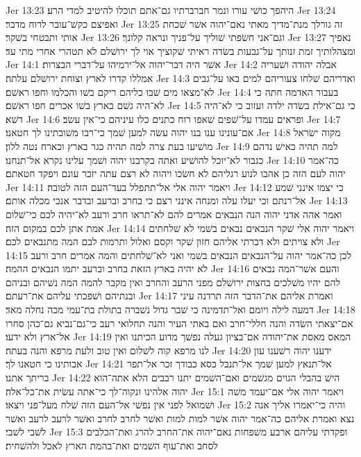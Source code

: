 Jer 13:23  היהפך כושׁי עורו ונמר חברברתיו גם־אתם תוכלו להיטיב למדי הרע׃
Jer 13:24  ואפיצם כקשׁ־עובר לרוח מדבר׃
Jer 13:25  זה גורלך מנת־מדיך מאתי נאם־יהוה אשׁר שׁכחת אותי ותבטחי בשׁקר׃
Jer 13:26  וגם־אני חשׂפתי שׁוליך על־פניך ונראה קלונך׃
Jer 13:27  נאפיך ומצהלותיך זמת זנותך על־גבעות בשׂדה ראיתי שׁקוציך אוי לך ירושׁלם לא תטהרי אחרי מתי עד׃
Jer 14:1  אשׁר היה דבר־יהוה אל־ירמיהו על־דברי הבצרות׃
Jer 14:2  אבלה יהודה ושׁעריה אמללו קדרו לארץ וצוחת ירושׁלם עלתה׃
Jer 14:3  ואדריהם שׁלחו צעוריהם למים באו על־גבים לא־מצאו מים שׁבו כליהם ריקם בשׁו והכלמו וחפו ראשׁם׃
Jer 14:4  בעבור האדמה חתה כי לא־היה גשׁם בארץ בשׁו אכרים חפו ראשׁם׃
Jer 14:5  כי גם־אילת בשׂדה ילדה ועזוב כי לא־היה דשׁא׃
Jer 14:6  ופראים עמדו על־שׁפים שׁאפו רוח כתנים כלו עיניהם כי־אין עשׂב׃
Jer 14:7  אם־עונינו ענו בנו יהוה עשׂה למען שׁמך כי־רבו משׁובתינו לך חטאנו׃
Jer 14:8  מקוה ישׂראל מושׁיעו בעת צרה למה תהיה כגר בארץ וכארח נטה ללון׃
Jer 14:9  למה תהיה כאישׁ נדהם כגבור לא־יוכל להושׁיע ואתה בקרבנו יהוה ושׁמך עלינו נקרא אל־תנחנו׃
Jer 14:10  כה־אמר יהוה לעם הזה כן אהבו לנוע רגליהם לא חשׂכו ויהוה לא רצם עתה יזכר עונם ויפקד חטאתם׃
Jer 14:11  ויאמר יהוה אלי אל־תתפלל בעד־העם הזה לטובה׃
Jer 14:12  כי יצמו אינני שׁמע אל־רנתם וכי יעלו עלה ומנחה אינני רצם כי בחרב וברעב ובדבר אנכי מכלה אותם׃
Jer 14:13  ואמר אהה אדני יהוה הנה הנבאים אמרים להם לא־תראו חרב ורעב לא־יהיה לכם כי־שׁלום אמת אתן לכם במקום הזה׃
Jer 14:14  ויאמר יהוה אלי שׁקר הנבאים נבאים בשׁמי לא שׁלחתים ולא צויתים ולא דברתי אליהם חזון שׁקר וקסם ואלול ותרמות לבם המה מתנבאים לכם׃
Jer 14:15  לכן כה־אמר יהוה על־הנבאים הנבאים בשׁמי ואני לא־שׁלחתים והמה אמרים חרב ורעב לא יהיה בארץ הזאת בחרב וברעב יתמו הנבאים ההמה׃
Jer 14:16  והעם אשׁר־המה נבאים להם יהיו משׁלכים בחצות ירושׁלם מפני הרעב והחרב ואין מקבר להמה המה נשׁיהם ובניהם ובנתיהם ושׁפכתי עליהם את־רעתם׃
Jer 14:17  ואמרת אליהם את־הדבר הזה תרדנה עיני דמעה לילה ויומם ואל־תדמינה כי שׁבר גדול נשׁברה בתולת בת־עמי מכה נחלה מאד׃
Jer 14:18  אם־יצאתי השׂדה והנה חללי־חרב ואם באתי העיר והנה תחלואי רעב כי־גם־נביא גם־כהן סחרו אל־ארץ ולא ידעו׃
Jer 14:19  המאס מאסת את־יהודה אם־בציון געלה נפשׁך מדוע הכיתנו ואין לנו מרפא קוה לשׁלום ואין טוב ולעת מרפא והנה בעתה׃
Jer 14:20  ידענו יהוה רשׁענו עון אבותינו כי חטאנו לך׃
Jer 14:21  אל־תנאץ למען שׁמך אל־תנבל כסא כבודך זכר אל־תפר בריתך אתנו׃
Jer 14:22  הישׁ בהבלי הגוים מגשׁמים ואם־השׁמים יתנו רבבים הלא אתה־הוא יהוה אלהינו ונקוה־לך כי־אתה עשׂית את־כל־אלה׃
Jer 15:1  ויאמר יהוה אלי אם־יעמד משׁה ושׁמואל לפני אין נפשׁי אל־העם הזה שׁלח מעל־פני ויצאו׃
Jer 15:2  והיה כי־יאמרו אליך אנה נצא ואמרת אליהם כה־אמר יהוה אשׁר למות למות ואשׁר לחרב לחרב ואשׁר לרעב לרעב ואשׁר לשׁבי לשׁבי׃
Jer 15:3  ופקדתי עליהם ארבע משׁפחות נאם־יהוה את־החרב להרג ואת־הכלבים לסחב ואת־עוף השׁמים ואת־בהמת הארץ לאכל ולהשׁחית׃
